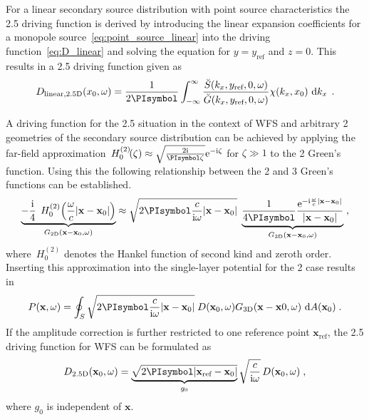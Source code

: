 \documentclass[a4paper]{book}
\newcommand{\PI}{\PIsymbol}%
\newcommand{\I}{\mathrm{i}}                          %
\newcommand{\E}{\mathrm{e}}                          %
\newcommand{\D}[1]{\mathop{\mathrm{d}{#1}}}          %
\renewcommand{\vec}[1]{\mathbf{#1}}                  %
\newcommand{\x}{\vec{x}}                             %
\newcommand{\omegac}{\frac{\omega}{c}}               %
\renewcommand{\H}[2]{\,H_{#1}^{(#2)}\!}              %
\newcommand{\qc}{\;,}                                             %
\newcommand{\qp}{\;.}                                             %
\def \twoD {{2\text{D}}\xspace}                                   %
\def \twohalfD {{2.5\text{D}}\xspace}                             %
\def \threeD {{3\text{D}}\xspace}                                 %
\begin{document}
{For a linear secondary source distribution with point source characteristics the
\twohalfD driving function is derived by introducing the
linear expansion coefficients for a monopole
source~\eqref{eq:point_source_linear} into the driving
function~\eqref{eq:D_linear} and solving the equation for $y = y_\text{ref}$ and
$z = 0$. This results in a \twohalfD driving function given
as\cite[][(3.77)]{Ahrens2012}
%
\begin{equation}
    D_{\text{linear},\twohalfD}(x_0,\omega) = \frac{1}{2\PI} \int_{-\infty}^\infty
    \frac{\breve{S}(k_x,y_\text{ref},0,\omega)}
    {\breve{G}(k_x,y_\text{ref},0,\omega)} \chi(k_x,x_0) \, \D{k_x} \qp
    \label{eq:D_linear_25D}
\end{equation}
%

A driving function for the \twohalfD situation in the context of WFS
and arbitrary \twoD geometries of the secondary source distribution
can be achieved by applying the
far-field approximation\cite[][(4.23)]{Williams1999}
$\H{0}{2}(\zeta) \approx \sqrt{\frac{2\I}{\PI \zeta}}
\E^{-\I\zeta}$ for $\zeta \gg 1$ to the \twoD Green's function.
Using this the
following relationship between the \twoD and \threeD
Green's functions can be established.
%
\begin{multline} 
    \underbrace{
    -\frac{\I}{4} \;\H{0}{2}\left(\omegac |\x-\x_0|\right)
    }_{G_\twoD(\x-\x_0,\omega)}
    \approx
    \sqrt{2\PI \frac{c}{\I\omega} |\x-\x_0|} \;
    \underbrace{
        \frac{1}{4 \PI} \frac{\E^{-\I\omegac|\x-\x_0|}}{|\x-\x_0|}
    }_{G_\threeD(\x-\x_0,\omega)} \qc
    \label{eq:25D_approximation}
\end{multline}
%
where $\H{0}{2}$ denotes the Hankel function of second kind and zeroth
order.
Inserting this approximation into the single-layer potential for the \twoD
case results in
%
\begin{equation}
    P(\x,\omega) = \oint_S \sqrt{2\PI \frac{c}{\I\omega} |\x-\x_0|} \;
    D(\x_0,\omega) G_\threeD(\x-\x0,\omega) \, \D A(\x_0) \qp
    \label{eq:single:layer_25D}
\end{equation}
%
If the amplitude correction is further restricted to one reference point
$\x_\text{ref}$, the \twohalfD driving function for WFS can be formulated
as
%
\begin{equation}
    D_\twohalfD(\x_0,\omega) = \underbrace{\sqrt{2\PI |\x_\text{ref}-\x_0|}}_{g_0}
    \sqrt{\frac{c}{\I\omega}} \,
    D(\x_0,\omega) \qc
    \label{eq:D25D_wfs}
\end{equation}
%
where $g_0$ is independent of $\x$.

}
\end{document}
